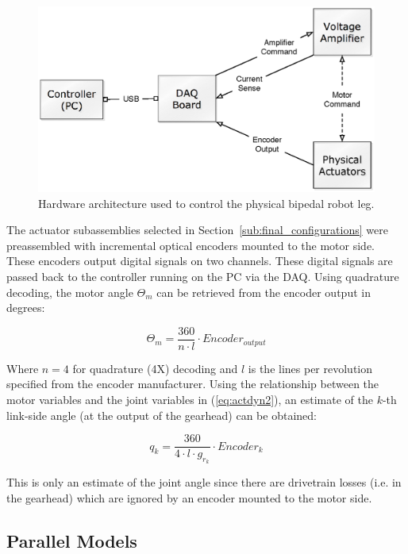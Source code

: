 \begin{figure}[!h]
	\centering
    \includegraphics[scale=0.65]{fig/experiments/hilarchitecture.eps} 
  	\caption{Hardware architecture used to control the physical bipedal robot leg.}
	\label{fig:hilarch}
\end{figure}

The actuator subassemblies selected in Section~\ref{sub:final_configurations} were preassembled with incremental optical encoders mounted to the motor side. These encoders output digital signals on two channels.  These digital signals are passed back to the controller running on the PC via the DAQ. Using quadrature decoding, the motor angle $\Theta _m$ can be retrieved from the encoder output in degrees: 

\begin{equation}
	{\Theta _m} = \frac{{360}}{{n \cdot l}} \cdot Encoder_{output}
\end{equation}

Where $n = 4$ for quadrature (4X) decoding and $l$ is the lines per revolution specified from the encoder manufacturer. Using the relationship between the motor variables and the joint variables in (\ref{eq:actdyn2}), an estimate of the $k$-th link-side angle (at the output of the gearhead) can be obtained: 

\begin{equation}
	{q_k} = \frac{{360}}{{4 \cdot l \cdot {g_{{r_k}}}}} \cdot Encode{r_k}
	\label{eq:quadrature}
\end{equation}

This is only an estimate of the joint angle since there are drivetrain losses (i.e. in the gearhead) which are ignored by an encoder mounted to the motor side. 

\subsection{Parallel Models} %
\label{sub:parallel_models}

